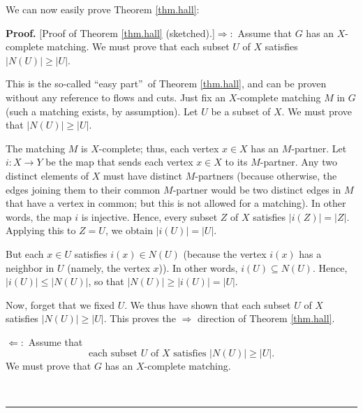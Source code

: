 \documentclass[numbers=enddot,12pt,final,onecolumn,notitlepage]{scrartcl}%
\theoremstyle{definition}
\newenvironment{proof}[1][Proof]{\noindent\textbf{#1.} }{\ \rule{0.5em}{0.5em}}
\begin{document}
We can now easily prove Theorem \ref{thm.hall}:

\begin{proof}
[Proof of Theorem \ref{thm.hall} (sketched).]$\Longrightarrow:$ Assume that
$G$ has an $X$-complete matching. We must prove that each subset $U$ of $X$
satisfies $\left\vert N\left(  U\right)  \right\vert \geq\left\vert
U\right\vert $.

This is the so-called \textquotedblleft easy part\textquotedblright\ of
Theorem \ref{thm.hall}, and can be proven without any reference to flows and
cuts. Just fix an $X$-complete matching $M$ in $G$ (such a matching exists, by
assumption). Let $U$ be a subset of $X$. We must prove that $\left\vert
N\left(  U\right)  \right\vert \geq\left\vert U\right\vert $.

The matching $M$ is $X$-complete; thus, each vertex $x\in X$ has an
$M$-partner. Let $i:X\rightarrow Y$ be the map that sends each vertex $x\in X$
to its $M$-partner. Any two distinct elements of $X$ must have distinct
$M$-partners (because otherwise, the edges joining them to their common
$M$-partner would be two distinct edges in $M$ that have a vertex in common;
but this is not allowed for a matching). In other words, the map $i$ is
injective. Hence, every subset $Z$ of $X$ satisfies $\left\vert i\left(
Z\right)  \right\vert =\left\vert Z\right\vert $. Applying this to $Z=U$, we
obtain $\left\vert i\left(  U\right)  \right\vert =\left\vert U\right\vert $.

But each $x\in U$ satisfies $i\left(  x\right)  \in N\left(  U\right)  $
(because the vertex $i\left(  x\right)  $ has a neighbor in $U$ (namely, the
vertex $x$)). In other words, $i\left(  U\right)  \subseteq N\left(  U\right)
$. Hence, $\left\vert i\left(  U\right)  \right\vert \leq\left\vert N\left(
U\right)  \right\vert $, so that $\left\vert N\left(  U\right)  \right\vert
\geq\left\vert i\left(  U\right)  \right\vert =\left\vert U\right\vert $.

Now, forget that we fixed $U$. We thus have shown that each subset $U$ of $X$
satisfies $\left\vert N\left(  U\right)  \right\vert \geq\left\vert
U\right\vert $. This proves the $\Longrightarrow$ direction of Theorem
\ref{thm.hall}.

$\Longleftarrow:$ Assume that
\begin{equation}
\text{each subset }U\text{ of }X\text{ satisfies }\left\vert N\left(
U\right)  \right\vert \geq\left\vert U\right\vert .
\label{pf.thm.hall.hard.ass}%
\end{equation}
We must prove that $G$ has an $X$-complete matching.


\end{proof}
\end{document}
